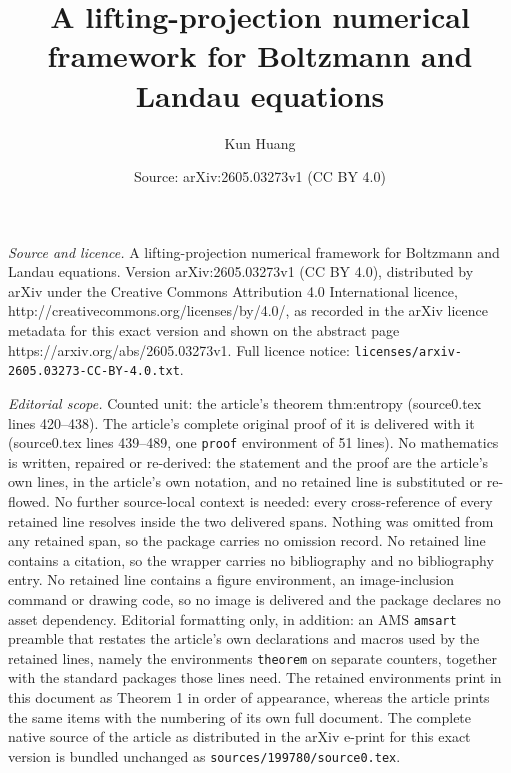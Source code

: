 \documentclass[10pt,a4paper]{amsart}
\title{A lifting-projection numerical framework for Boltzmann and Landau equations}
\author{Kun Huang}
\date{Source: arXiv:2605.03273v1 (CC BY 4.0)}
\begin{document}
\maketitle

\noindent\emph{Source and licence.} A lifting-projection numerical framework for Boltzmann and Landau equations. Version arXiv:2605.03273v1 (CC BY 4.0), distributed by arXiv under the Creative Commons Attribution 4.0 International licence, http://creativecommons.org/licenses/by/4.0/, as recorded in the arXiv licence metadata for this exact version and shown on the abstract page https://arxiv.org/abs/2605.03273v1. Full licence notice: \texttt{licenses/arxiv-2605.03273-CC-BY-4.0.txt}.\par\smallskip

\noindent\textit{Editorial scope.} Counted unit: the article's theorem thm:entropy (source0.tex lines 420--438). The article's complete original proof of it is delivered with it (source0.tex lines 439--489, one \texttt{proof} environment of 51 lines). No mathematics is written, repaired or re-derived: the statement and the proof are the article's own lines, in the article's own notation, and no retained line is substituted or re-flowed.  No further source-local context is needed: every cross-reference of every retained line resolves inside the two delivered spans.  Nothing was omitted from any retained span, so the package carries no omission record.  No retained line contains a citation, so the wrapper carries no bibliography and no bibliography entry.  No retained line contains a figure environment, an image-inclusion command or drawing code, so no image is delivered and the package declares no asset dependency.  Editorial formatting only, in addition: an AMS \texttt{amsart} preamble that restates the article's own declarations and macros used by the retained lines, namely the environments \texttt{theorem} on separate counters, together with the standard packages those lines need.  The retained environments print in this document as Theorem 1 in order of appearance, whereas the article prints the same items with the numbering of its own full document.  The complete native source of the article as distributed in the arXiv e-print for this exact version is bundled unchanged as \texttt{sources/199780/source0.tex}.
\end{document}
